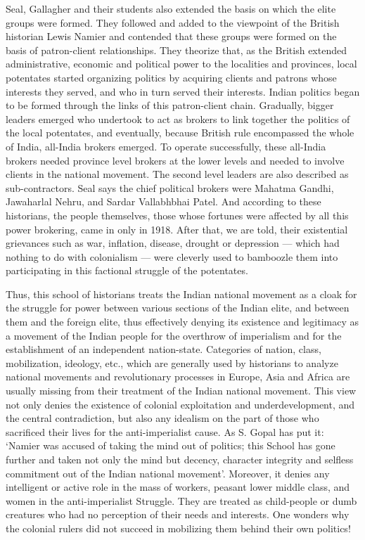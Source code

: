 Seal, Gallagher and their students also extended the basis on which the elite groups were formed. They followed and added to the viewpoint of the British historian Lewis Namier and contended that these groups were formed on the basis of patron-client relationships. They theorize that, as the British extended administrative, economic and political power to the localities and provinces, local potentates started organizing politics by acquiring clients and patrons whose interests they served, and who in turn served their interests. Indian politics began to be formed through the links of this patron-client chain. Gradually, bigger leaders emerged who undertook to act as brokers to link together the politics of the local potentates, and eventually, because British rule encompassed the whole of India, all-India brokers emerged. To operate successfully, these all-India brokers needed province level brokers at the lower levels and needed to involve clients in the national movement. The second level leaders are also described as sub-contractors. Seal says the chief political brokers were Mahatma Gandhi, Jawaharlal Nehru, and Sardar Vallabhbhai Patel. And according to these historians, the people themselves, those whose fortunes were affected by all this power brokering, came in only in 1918. After that, we are told, their existential grievances such as war, inflation, disease, drought or depression --- which had nothing to do with colonialism --- were cleverly used to bamboozle them into participating in this factional struggle of the potentates.

Thus, this school of historians treats the Indian national movement as a cloak for the struggle for power between various sections of the Indian elite, and between them and the foreign elite, thus effectively denying its existence and legitimacy as a movement of the Indian people for the overthrow of imperialism and for the establishment of an independent nation-state. Categories of nation, class, mobilization, ideology, etc., which are generally used by historians to analyze national movements and revolutionary processes in Europe, Asia and Africa are usually missing from their treatment of the Indian national movement. This view not only denies the existence of colonial exploitation and underdevelopment, and the central contradiction, but also any idealism on the part of those who sacrificed their lives for the anti-imperialist cause. As S. Gopal has put it: `Namier was accused of taking the mind out of politics; this School has gone further and taken not only the mind but decency, character integrity and selfless commitment out of the Indian national movement'. Moreover, it denies any intelligent or active role in the mass of workers, peasant lower middle class, and women in the anti-imperialist Struggle. They are treated as child-people or dumb creatures who had no perception of their needs and interests. One wonders why the colonial rulers did not succeed in mobilizing them behind their own politics!

